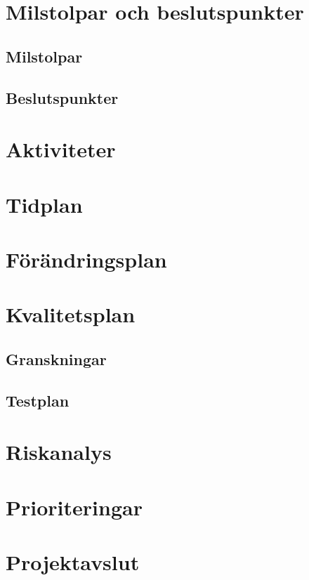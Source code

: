 \documentclass[a4paper,11pt]{article}
\begin{document}
\section{Milstolpar och beslutspunkter}
\subsection{Milstolpar}
\subsection{Beslutspunkter}

\section{Aktiviteter}

\section{Tidplan}

\section{Förändringsplan}

\section{Kvalitetsplan}

\subsection{Granskningar}

\subsection{Testplan}

\section{Riskanalys}

\section{Prioriteringar}

\section{Projektavslut}

\begin{appendices}
\end{appendices}
\end{document}
